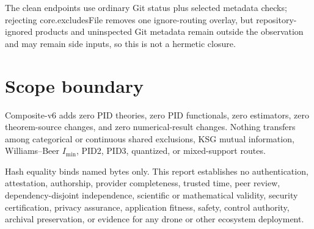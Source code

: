 \documentclass[11pt,a4paper]{article}
\begin{document}
The clean endpoints use ordinary Git status plus selected metadata checks; rejecting
core.excludesFile removes one ignore-routing overlay, but repository-ignored products and
uninspected Git metadata remain outside the observation and may remain side inputs, so this is not
a hermetic closure.

\section{Scope boundary}

Composite-v6 adds zero PID theories, zero PID functionals, zero estimators, zero theorem-source
changes, and zero numerical-result changes. Nothing transfers among categorical or continuous
shared exclusions, KSG mutual information, Williams--Beer $I_{\min}$, PID2, PID3, quantized, or
mixed-support routes.

Hash equality binds named bytes only. This report establishes no authentication, attestation,
authorship, provider completeness, trusted time, peer review, dependency-disjoint independence,
scientific or mathematical validity, security certification, privacy assurance, application
fitness, safety, control authority, archival preservation, or evidence for any drone or other
ecosystem deployment.
\end{document}
